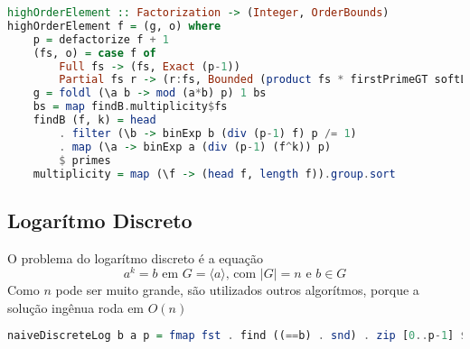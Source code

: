 \documentclass{article}
\begin{document}
\noindent\hspace{0.03\linewidth}
\begin{minipage}{.9\linewidth}
\begin{lstlisting}[language=haskell,caption=Algoritmo de Gauss]
highOrderElement :: Factorization -> (Integer, OrderBounds)
highOrderElement f = (g, o) where
    p = defactorize f + 1
    (fs, o) = case f of
        Full fs -> (fs, Exact (p-1))
        Partial fs r -> (r:fs, Bounded (product fs * firstPrimeGT softLimit) (p-1))
    g = foldl (\a b -> mod (a*b) p) 1 bs
    bs = map findB.multiplicity$fs
    findB (f, k) = head
        . filter (\b -> binExp b (div (p-1) f) p /= 1)
        . map (\a -> binExp a (div (p-1) (f^k)) p)
        $ primes
    multiplicity = map (\f -> (head f, length f)).group.sort

\end{lstlisting}
\end{minipage}

\subsection{Logarítmo Discreto}
O problema do logarítmo discreto é a equação
$$ a^k = b \text{ em } G = \langle a \rangle\text{, com }|G| = n\text{ e }b \in G$$
Como $n$ pode ser muito grande, são utilizados outros algorítmos, porque a solução ingênua roda em $O(n)$

\noindent\hspace{0.03\linewidth}
\begin{minipage}{.9\linewidth}
\begin{lstlisting}[language=haskell,caption=Logarítmo Discreto Ingênuo]
naiveDiscreteLog b a p = fmap fst . find ((==b) . snd) . zip [0..p-1] $ iterate ((`mod`p) . (*a)) 1
\end{lstlisting}
\end{minipage}
\end{document}
